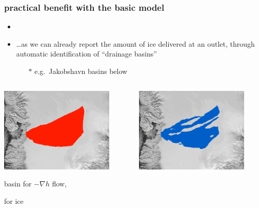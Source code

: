 \documentclass[hide notes,intlimits]{beamer}
\begin{document}
\begin{frame}
  \frametitle{practical benefit with the basic model}
 
\begin{itemize}
\item  {}
\item \dots as we can already report the amount of ice delivered at an outlet, through automatic identification of ``drainage basins''
  \begin{itemize}
  \item[$\ast$] e.g.~Jakobshavn basins below
  \end{itemize}
\end{itemize}

\vspace{-5mm}

\begin{columns}
\begin{column}{0.5\textwidth}
\begin{center}
\includegraphics[width=0.85\textwidth]{ftt-mask}

basin for $-\nabla h$ flow,

\phantom{where $\phi$}

for ice
\end{center}
\end{column}
\begin{column}{0.5\textwidth}
\begin{center}
\vspace{0.5mm}

\includegraphics[width=0.85\textwidth]{hydro-mask}


\end{center}
\end{column}
\end{columns}
\end{frame}
\end{document}
